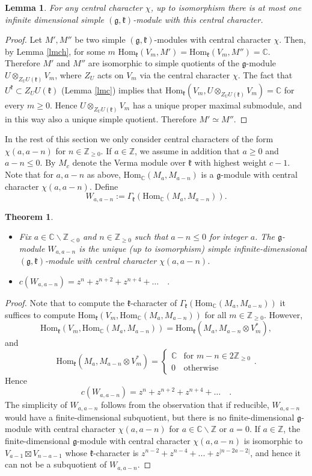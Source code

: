 \documentclass[12pt]{amsart}
\theoremstyle{plain} %
\newtheorem{theorem}[definition]{Theorem}
\newtheorem{lemma}[definition]{Lemma}
\renewcommand{\hom}{\mathrm{Hom}}
\newcommand {\ZZ} {\mathbb {Z}}
\newcommand {\CC} {\mathbb {C}}
\newcommand{\kk}{\mathfrak{k}}
\renewcommand{\gg}{\mathfrak{g}}
\newcommand{\refle}[1]{Lemma \ref{#1}}
\begin{document}
\begin{lemma}\label{le00}
For any central character $\chi$, up to isomorphism there is at most one infinite
dimensional simple $(\gg,\kk)$-module with this central character.
\end{lemma}
\begin{proof}
Let $M',M''$ be two simple $(\gg,\kk)$-modules with central character
$\chi$. Then, by \refle{lmch}, for some $m$
$\hom_\kk(V_m,M')=\hom_\kk(V_m,M'')=\CC$. Therefore $M'$ and $M''$ are
isomorphic to simple quotients of the $\gg$-module $U\otimes_{Z_U
  U(\kk)}V_m$, where $Z_U$ acts on $V_m$ via the central character
$\chi$. The fact that $U^\kk\subset Z_U U(\kk)$ (\refle{lmc}) implies
that $\hom_\kk(V_m, U\otimes_{Z_U U(\kk)}V_m)=\CC$ for every $m\geq
0$. Hence $U\otimes_{Z_U U(\kk)}V_m$ has a unique proper maximal
submodule, and in this way also a unique simple quotient. Therefore $M'\simeq M''$.
\end{proof}

In the rest of this section  we only consider central characters of
the form $\chi(a,a-n)$ for $n\in\mathbb Z_{\geq 0}$. If $a\in \ZZ$, we assume in addition that $a\geq 0$ and $a-n \leq 0$. By $M_c$ denote the Verma module over $\kk$ with highest weight $c-1$. Note that
for $a,a-n$ as above, $\hom_{\CC}(M_{a},M_{a-n})$ is a $\gg$-module with central character $\chi(a,a-n)$. Define
\[
W_{a,a-n}:=\Gamma_{\kk}(\hom_{\CC} (M_{a},M_{a-n})).
\]
\begin{theorem}\label{thMainSCT}~
\begin{itemize}
\item[(a)] Fix $a\in\CC\backslash \ZZ_{< 0}$ and $n\in \ZZ_{\geq 0}$ such that $a-n\leq 0$ for integer $a$. The $\gg$-module $W_{a,a-n}$ is the unique (up to isomorphism) simple infinite-dimensional $(\gg,\kk)$-module with central character $\chi(a,a-n)$.
\item[(b)] $c(W_{a,a-n})=z^n+z^{n+2}+z^{n+4}+\dots\quad .$
\end{itemize}
\end{theorem}
\begin{proof} Note that to compute the
$\kk$-character of
$\Gamma_{\kk}(\hom_{\CC}(M_a,M_{a-n}))$ it suffices to compute
  $\hom_\kk(V_m,\hom_{\CC}(M_a,M_{a-n}))$ for all $m\in \ZZ_{\geq 0}$. However,
\[
\hom_\kk(V_m,\hom_{\CC}(M_a,M_{a-n}))=\hom_\kk(M_a,M_{a-n}\otimes V_m^*),
\]
and
\[
\hom_\kk(M_a, M_{a-n}\otimes V_m^*)=\left\{\begin{array}{cc}\CC&\text{for~}m-n\in2\ZZ_{\geq 0}\\0&\text{otherwise}\end{array}\right. .
\]
Hence
\[
c(W_{a,a-n})=z^n+z^{n+2}+z^{n+4}+\dots\quad .
\]
The simplicity of $W_{a,a-n}$ follows from the observation that if reducible, $W_{a,a-n}$ would have a finite-dimensional subquotient, but
there is no finite-dimensional $\gg$-module with central character
$\chi(a,a-n)$ for $a\in \CC\backslash \ZZ$ or $a=0$.  If $a\in
\ZZ $, the finite-dimensional $\gg$-module with central
character $\chi(a,a-n)$ is isomorphic to $V_{a-1}\boxtimes V_{n-a-1}$
whose $\kk$-character is $z^{n-2}+z^{n-4}+...+z^{|n-2a-2|}$, and
hence it can not be a subquotient of $W_{a,a-n}$.
\end{proof}
\end{document}
